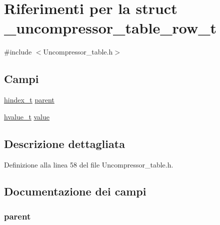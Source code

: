 \hypertarget{struct__uncompressor__table__row__t}{\section{Riferimenti per la struct \-\_\-uncompressor\-\_\-table\-\_\-row\-\_\-t}
\label{struct__uncompressor__table__row__t}
}


{\ttfamily \#include $<$Uncompressor\-\_\-table.\-h$>$}

\subsection*{Campi}
\begin{DoxyCompactItemize}
\item 
\hyperlink{_common_8h_a9e5efd01ad4bc79efcef95aee756b06a}{hindex\-\_\-t} \hyperlink{struct__uncompressor__table__row__t_afcbfa18627869ca8efe6e3e9d1fcceb3}{parent}
\item 
\hyperlink{_common_8h_a59e7e401edd661023c103ec038bc4ab2}{hvalue\-\_\-t} \hyperlink{struct__uncompressor__table__row__t_ab069f2f375ef177b2e783fed615c001e}{value}
\end{DoxyCompactItemize}


\subsection{Descrizione dettagliata}


Definizione alla linea 58 del file Uncompressor\-\_\-table.\-h.



\subsection{Documentazione dei campi}
\hypertarget{struct__uncompressor__table__row__t_afcbfa18627869ca8efe6e3e9d1fcceb3}{
\subsubsection[{parent}]{ parent}}\label{struct__uncompressor__table__row__t_afcbfa18627869ca8efe6e3e9d1fcceb3}


